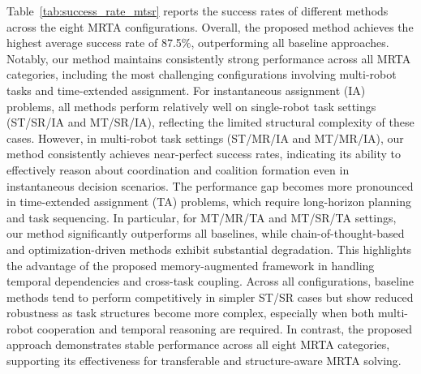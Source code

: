 \documentclass[letterpaper,journal]{IEEEtran}
\begin{document}
Table~\ref{tab:success_rate_mtsr} reports the success rates of different methods across the eight MRTA configurations. Overall, the proposed method achieves the highest average success rate of 87.5\%, outperforming all baseline approaches. Notably, our method maintains consistently strong performance across all MRTA categories, including the most challenging configurations involving multi-robot tasks and time-extended assignment. For instantaneous assignment (IA) problems, all methods perform relatively well on single-robot task settings (ST/SR/IA and MT/SR/IA), reflecting the limited structural complexity of these cases. However, in multi-robot task settings (ST/MR/IA and MT/MR/IA), our method consistently achieves near-perfect success rates, indicating its ability to effectively reason about coordination and coalition formation even in instantaneous decision scenarios. The performance gap becomes more pronounced in time-extended assignment (TA) problems, which require long-horizon planning and task sequencing.
In particular, for MT/MR/TA and MT/SR/TA settings, our method significantly outperforms all baselines, while chain-of-thought-based and optimization-driven methods exhibit substantial degradation.
This highlights the advantage of the proposed memory-augmented framework in handling temporal dependencies and cross-task coupling. Across all configurations, baseline methods tend to perform competitively in simpler ST/SR cases but show reduced robustness as task structures become more complex, especially when both multi-robot cooperation and temporal reasoning are required.
In contrast, the proposed approach demonstrates stable performance across all eight MRTA categories, supporting its effectiveness for transferable and structure-aware MRTA solving.
\end{document}
